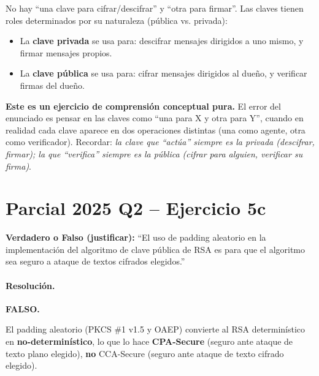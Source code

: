 \documentclass[11pt,a4paper]{article}
\begin{document}
No hay ``una clave para cifrar/descifrar'' y ``otra para firmar''. Las claves tienen roles determinados por su naturaleza (pública vs. privada):
\begin{itemize}
  \item La \textbf{clave privada} se usa para: descifrar mensajes dirigidos a uno mismo, y firmar mensajes propios.
  \item La \textbf{clave pública} se usa para: cifrar mensajes dirigidos al dueño, y verificar firmas del dueño.
\end{itemize}

\begin{tipsbox}
\textbf{Este es un ejercicio de comprensión conceptual pura.} El error del enunciado es pensar en las claves como ``una para X y otra para Y'', cuando en realidad cada clave aparece en dos operaciones distintas (una como agente, otra como verificador). Recordar: \emph{la clave que ``actúa'' siempre es la privada (descifrar, firmar); la que ``verifica'' siempre es la pública (cifrar para alguien, verificar su firma)}.
\end{tipsbox}

\section{Parcial 2025 Q2 -- Ejercicio 5c}
\label{sec:rsa2025Q2}

\begin{consignabox}
\textbf{Verdadero o Falso (justificar):} ``El uso de padding aleatorio en la implementación del algoritmo de clave pública de RSA es para que el algoritmo sea seguro a ataque de textos cifrados elegidos.''
\end{consignabox}

\paragraph{Resolución.}

\textbf{FALSO.}

El padding aleatorio (PKCS \#1 v1.5 y OAEP) convierte al RSA determinístico en \textbf{no-determinístico}, lo que lo hace \textbf{CPA-Secure} (seguro ante ataque de texto plano elegido), \textbf{no} CCA-Secure (seguro ante ataque de texto cifrado elegido).
\end{document}
